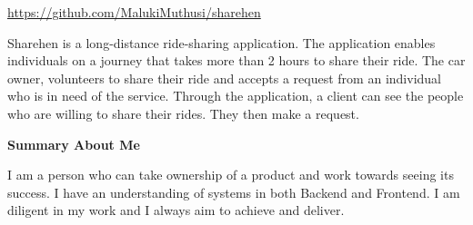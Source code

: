 \documentclass[a4paper]{article}
\begin{document}
\centering \href{https://github.com/MalukiMuthusi/sharehen}{https://github.com/MalukiMuthusi/sharehen}

Sharehen is a long-distance ride-sharing application. The application enables individuals on a journey that takes more than 2 hours to share their ride. The car owner, volunteers to share their ride and accepts a request from an individual who is in need of the service. Through the application, a client can see the people who are willing to share their rides. They then make a request.


\begin{center}
    {\Large \textbf{Summary About Me}}
\end{center}

I am a person who can take ownership of a product and work towards seeing its success. I have an understanding of systems in both Backend and Frontend. I am diligent in my work and I always aim to achieve and deliver.

\end{document}
